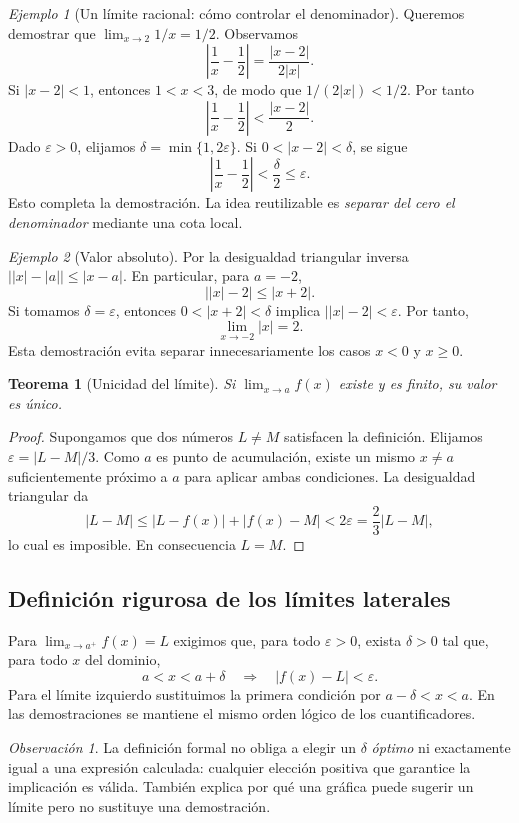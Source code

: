 \documentclass[12pt]{article}
\newtheorem{teorema}[definicion]{Teorema}
\theoremstyle{remark}
\newtheorem{observacion}{Observación}
\newtheorem{ejemplo}{Ejemplo}
\begin{document}
\begin{ejemplo}[Un límite racional: cómo controlar el denominador]
Queremos demostrar que $\lim_{x\to2}1/x=1/2$. Observamos
\[
 \left|\frac1x-\frac12\right|=\frac{|x-2|}{2|x|}.
\]
Si $|x-2|<1$, entonces $1<x<3$, de modo que $1/(2|x|)<1/2$. Por tanto
\[
 \left|\frac1x-\frac12\right|<\frac{|x-2|}{2}.
\]
Dado $\varepsilon>0$, elijamos $\delta=\min\{1,2\varepsilon\}$. Si $0<|x-2|<\delta$, se sigue
\[
 \left|\frac1x-\frac12\right|<\frac{\delta}{2}\le\varepsilon.
\]
Esto completa la demostración. La idea reutilizable es \emph{separar del cero el denominador} mediante una cota local.
\end{ejemplo}

\begin{ejemplo}[Valor absoluto]
Por la desigualdad triangular inversa $\bigl||x|-|a|\bigr|\le|x-a|$. En particular, para $a=-2$,
\[
 \bigl||x|-2\bigr|\le|x+2|.
\]
Si tomamos $\delta=\varepsilon$, entonces $0<|x+2|<\delta$ implica $\bigl||x|-2\bigr|<\varepsilon$. Por tanto,
\[
 \boxed{\lim_{x\to-2}|x|=2}.
\]
Esta demostración evita separar innecesariamente los casos $x<0$ y $x\ge0$.
\end{ejemplo}

\begin{teorema}[Unicidad del límite]
Si $\lim_{x\to a}f(x)$ existe y es finito, su valor es único.
\end{teorema}
\begin{proof}
Supongamos que dos números $L\ne M$ satisfacen la definición. Elijamos $\varepsilon=|L-M|/3$. Como $a$ es punto de acumulación, existe un mismo $x\ne a$ suficientemente próximo a $a$ para aplicar ambas condiciones. La desigualdad triangular da
\[
 |L-M|\le|L-f(x)|+|f(x)-M|<2\varepsilon=\frac23|L-M|,
\]
lo cual es imposible. En consecuencia $L=M$.
\end{proof}

\subsection*{Definición rigurosa de los límites laterales}
Para $\lim_{x\to a^+}f(x)=L$ exigimos que, para todo $\varepsilon>0$, exista $\delta>0$ tal que, para todo $x$ del dominio,
\[
 a<x<a+\delta\quad\Longrightarrow\quad|f(x)-L|<\varepsilon.
\]
Para el límite izquierdo sustituimos la primera condición por $a-\delta<x<a$. En las demostraciones se mantiene el mismo orden lógico de los cuantificadores.

\begin{observacion}
La definición formal no obliga a elegir un $\delta$ \emph{óptimo} ni exactamente igual a una expresión calculada: cualquier elección positiva que garantice la implicación es válida. También explica por qué una gráfica puede sugerir un límite pero no sustituye una demostración.
\end{observacion}
\end{document}
